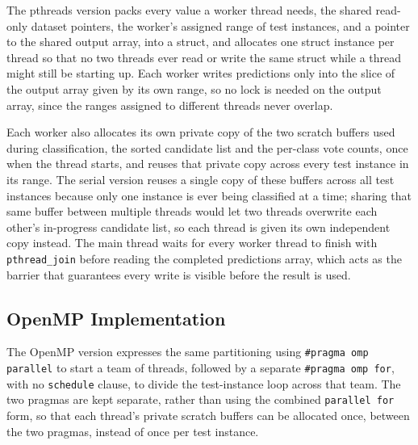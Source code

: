 \documentclass[conference]{IEEEtran}
\begin{document}
The pthreads version packs every value a worker thread needs, the shared
read-only dataset pointers, the worker's assigned range of test instances,
and a pointer to the shared output array, into a struct, and allocates one
struct instance per thread so that no two threads ever read or write the
same struct while a thread might still be starting up. Each worker writes
predictions only into the slice of the output array given by its own
range, so no lock is needed on the output array, since the ranges assigned
to different threads never overlap.

Each worker also allocates its own private copy of the two scratch
buffers used during classification, the sorted candidate list and the
per-class vote counts, once when the thread starts, and reuses that
private copy across every test instance in its range. The serial version
reuses a single copy of these buffers across all test instances because
only one instance is ever being classified at a time; sharing that same
buffer between multiple threads would let two threads overwrite each
other's in-progress candidate list, so each thread is given its own
independent copy instead. The main thread waits for every worker thread to
finish with \texttt{pthread\_join} before reading the completed
predictions array, which acts as the barrier that guarantees every write
is visible before the result is used.

\subsection{OpenMP Implementation}

The OpenMP version expresses the same partitioning using
\texttt{\#pragma omp parallel} to start a team of threads, followed by a
separate \texttt{\#pragma omp for}, with no \texttt{schedule} clause, to
divide the test-instance loop across that team. The two pragmas are kept separate,
rather than using the combined \texttt{parallel for} form, so that each
thread's private scratch buffers can be allocated once, between the two
pragmas, instead of once per test instance.
\end{document}
